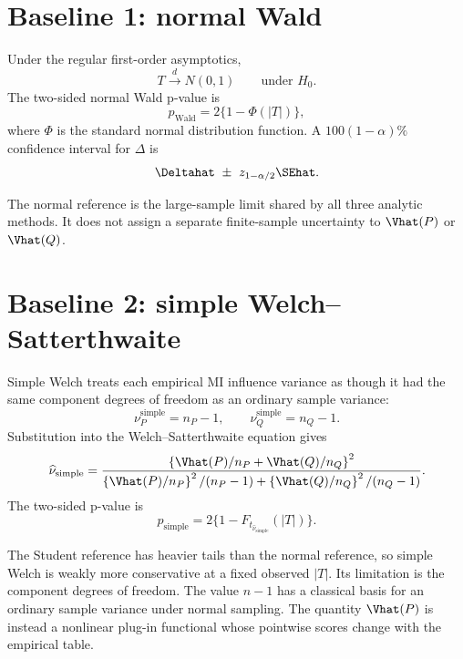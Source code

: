 \section{Baseline 1: normal Wald}

Under the regular first-order asymptotics,
\begin{equation}
  T\xrightarrow{d}N(0,1)
  \qquad\text{under }H_0.
\end{equation}
The two-sided normal Wald p-value is
\begin{equation}
  p_{\mathrm{Wald}}
  =2\{1-\Phi(|T|)\},
  \label{eq:wald-pvalue}
\end{equation}
where \(\Phi\) is the standard normal distribution function. A
\(100(1-\alpha)\%\) confidence interval for \(\Delta\) is
\begin{equation}
  \Deltahat
  \ \pm\
  z_{1-\alpha/2}\SEhat.
  \label{eq:wald-ci}
\end{equation}

The normal reference is the large-sample limit shared by all three analytic
methods. It does not assign a separate finite-sample uncertainty to
\(\Vhat(P)\) or \(\Vhat(Q)\).

\section{Baseline 2: simple Welch--Satterthwaite}

Simple Welch treats each empirical MI influence variance as though it had the
same component degrees of freedom as an ordinary sample variance:
\begin{equation}
  \nu_P^{\mathrm{simple}}=n_P-1,
  \qquad
  \nu_Q^{\mathrm{simple}}=n_Q-1.
\end{equation}
Substitution into the Welch--Satterthwaite equation gives
\begin{equation}
  \widehat\nu_{\mathrm{simple}}
  =
  \frac{
  \left\{\Vhat(P)/n_P+\Vhat(Q)/n_Q\right\}^2
  }{
  \left\{\Vhat(P)/n_P\right\}^2/(n_P-1)
  +
  \left\{\Vhat(Q)/n_Q\right\}^2/(n_Q-1)
  }.
  \label{eq:simple-welch-df}
\end{equation}
The two-sided p-value is
\begin{equation}
  p_{\mathrm{simple}}
  =2\{1-F_{t_{\widehat\nu_{\mathrm{simple}}}}(|T|)\}.
  \label{eq:simple-welch-p}
\end{equation}

The Student reference has heavier tails than the normal reference, so simple
Welch is weakly more conservative at a fixed observed \(|T|\). Its limitation
is the component degrees of freedom. The value \(n-1\) has a classical basis
for an ordinary sample variance under normal sampling. The quantity
\(\Vhat(P)\) is instead a nonlinear plug-in functional whose pointwise scores
change with the empirical table.

